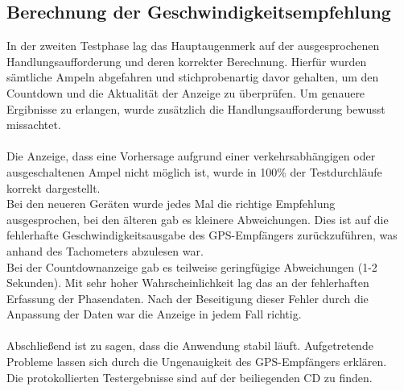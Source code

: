 \subsection{Berechnung der Geschwindigkeitsempfehlung}
In der zweiten Testphase lag das Hauptaugenmerk auf der ausgesprochenen Handlungsaufforderung und deren korrekter Berechnung. Hierfür wurden sämtliche Ampeln abgefahren und stichprobenartig davor gehalten, um den Countdown und die Aktualität der Anzeige zu überprüfen. Um genauere Ergibnisse zu erlangen, wurde zusätzlich die Handlungsaufforderung bewusst missachtet.\\\\  
Die Anzeige, dass eine Vorhersage aufgrund einer verkehrsabhängigen oder ausgeschaltenen Ampel nicht möglich ist, wurde in 100\% der Testdurchläufe korrekt dargestellt.\\ 
Bei den neueren Geräten wurde jedes Mal die richtige Empfehlung ausgesprochen, bei den älteren gab es kleinere Abweichungen. Dies ist auf die fehlerhafte Geschwindigkeitsausgabe des \gls{GPS}-Empfängers zurückzuführen, was anhand des Tachometers abzulesen war. \\
Bei der Countdownanzeige gab es teilweise geringfügige Abweichungen (1-2 Sekunden). Mit sehr hoher Wahrscheinlichkeit lag das an der fehlerhaften Erfassung der Phasendaten. Nach der Beseitigung dieser Fehler durch die Anpassung der Daten war die Anzeige in jedem Fall richtig.\\\\
Abschließend ist zu sagen, dass die Anwendung stabil läuft. Aufgetretende Probleme lassen sich durch die Ungenauigkeit des \gls{GPS}-Empfängers erklären.\\
Die protokollierten Testergebnisse sind auf der beiliegenden CD zu finden.
